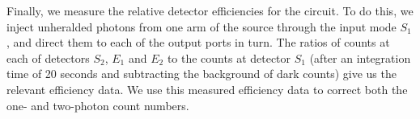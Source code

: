 Finally, we measure the relative detector efficiencies for the circuit. To do
this, we inject unheralded photons from one arm of the source through the input
mode \(S_1\), and direct them to each of the output ports in turn. The ratios of
counts at each of detectors \(S_2\), \(E_1\) and \(E_2\) to the counts at
detector \(S_1\) (after an integration time of 20 seconds and subtracting the
background of dark counts) give us the relevant efficiency data. We use this
measured efficiency data to correct both the one- and two-photon count numbers.

